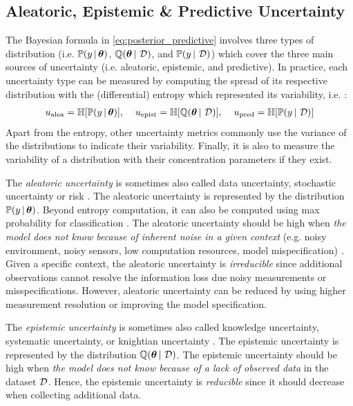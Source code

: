 \subsection{Aleatoric, Epistemic \& Predictive Uncertainty}

The Bayesian formula in \cref{eq:posterior_predictive} involves three types of distribution (i.e. $\mathbb{P}(y \,|\, \bm{\theta})$, $\operatorname{\mathbb{Q}}(\bm{\theta} \,|\, \operatorname{\mathcal{D}})$, and $\mathbb{P}(y \,|\, \operatorname{\mathcal{D}})$) which cover the three main sources of uncertainty (i.e. aleatoric, epistemic, and predictive).
In practice, each uncertainty type can be measured by computing the spread of its respective distribution with the (differential) entropy which represented its variability, i.e. \citep{PriorNetworks,uncertainty-deep-learning}:
\begin{align}
     u_\text{alea} = \operatorname{\mathbb{H}}[\mathbb{P}(y \,|\, \bm{\theta})], \hspace{4mm}
     u_\text{epist} = \operatorname{\mathbb{H}}[\operatorname{\mathbb{Q}}(\bm{\theta} \,|\, \operatorname{\mathcal{D}})], \hspace{4mm}
     u_\text{pred} = \operatorname{\mathbb{H}}[\mathbb{P}(y \,|\, \operatorname{\mathcal{D}})]
\end{align}
Apart from the entropy, other uncertainty metrics commonly use the variance of the distributions to indicate their variability. Finally, it is also to measure the variability of a distribution with their concentration parameters if they exist.

The \emph{aleatoric uncertainty} is sometimes also called data uncertainty, stochastic uncertainty or risk \cite{hullermeier2021aleatoric,knight1921, malini2018}. 
The aleatoric uncertainty is represented by the distribution $\mathbb{P}(y \,|\, \bm{\theta})$.
Beyond entropy computation, it can also be computed using max probability for classification \cite{malini2018}.
The aleatoric uncertainty should be high when \emph{the model does not know because of inherent noise in a given context} (e.g. noisy environment, noisy sensors, low computation resources, model mispecification) \cite{wenger2022posterior, hullermeier2021aleatoric}.
Given a specific context, the aleatoric uncertainty is \emph{irreducible} since additional observations cannot resolve the information loss due noisy measurements or misspecifications. 
However, aleatoric uncertainty can be reduced by using higher measurement resolution or improving the model specification. 

The \emph{epistemic uncertainty} is sometimes also called knowledge uncertainty, systematic uncertainty, or knightian uncertainty \cite{hullermeier2021aleatoric,knight1921,malini2018}.
The epistemic uncertainty is represented by the distribution $\operatorname{\mathbb{Q}}(\bm{\theta} \,|\, \operatorname{\mathcal{D}})$.
The epistemic uncertainty should be high when \emph{the model does not know because of a lack of observed data} in the dataset $\operatorname{\mathcal{D}}$.
Hence, the epistemic uncertainty is \emph{reducible} since it should decrease when collecting additional data.

